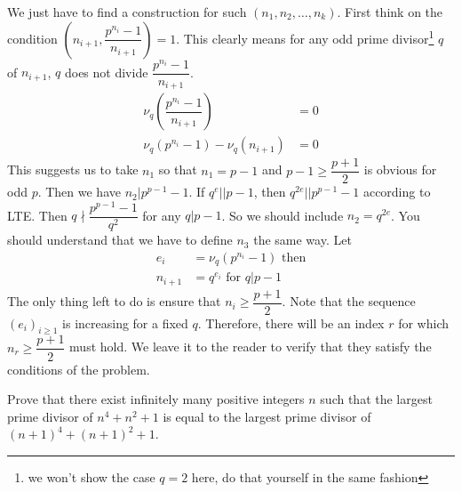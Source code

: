 \documentclass[problems.tex]{subfile}
\begin{document}
\begin{solution}
		We just have to find a construction for such $(n_1,n_2,\ldots,n_k)$. First think on the condition $\left(n_{i+1},\dfrac{p^{n_i}-1}{n_{i+1}}\right)=1$. This clearly means for any odd prime divisor\footnote{we won't show the case $q=2$ here, do that yourself in the same fashion} $q$ of $n_{i+1}$, $q$ does not divide $\dfrac{p^{n_i}-1}{n_{i+1}}$.
			\begin{align*}
				\nu_q\left(\dfrac{p^{n_i}-1}{n_{i+1}}\right) & = 0\\
				\nu_q(p^{n_i}-1)-\nu_q(n_{i+1}) & = 0
			\end{align*}
		This suggests us to take $n_1$ so that $n_1=p-1$ and $p-1\geq\dfrac{p+1}{2}$ is obvious for odd $p$. Then we have $n_2|p^{p-1}-1$. If $q^e||p-1$, then $q^{2e}||p^{p-1}-1$ according to LTE. Then $q\nmid\dfrac{p^{p-1}-1}{q^2}$ for any $q|p-1$. So we should include $n_2=q^{2e}$. You should understand that we have to define $n_3$ the same way. Let
			\begin{align*}
				e_i & = \nu_q\left(p^{n_i}-1\right)\text { then}\\
				n_{i+1} & = q^{e_i}\text { for }q|p-1
			\end{align*}
		The only thing left to do is ensure that $n_i\geq\dfrac{p+1}{2}$. Note that the sequence $(e_i)_{i\geq1}$ is increasing for a fixed $q$. Therefore, there will be an index $r$ for which $n_r\geq\dfrac{p+1}{2}$ must hold. We leave it to the reader to verify that they satisfy the conditions of the problem.
	\end{solution}
	
	\begin{problem}
		Prove that there exist infinitely many positive integers $n$ such that the largest prime divisor of $n^4+n^2+1$ is equal to the largest prime divisor of $(n+1)^4+(n+1)^2+1$.
	\end{problem}
	
\end{document}

